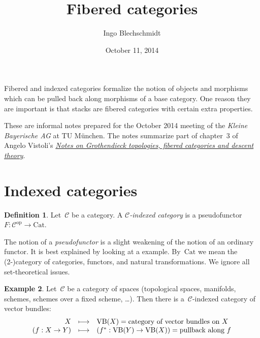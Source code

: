 \documentclass[a4paper,english,12pt]{scrartcl}
\theoremstyle{definition}
\newtheorem{defn}{Definition}[section]
\newtheorem{ex}[defn]{Example}
\theoremstyle{plain}
\theoremstyle{remark}
\newcommand{\C}{\mathcal{C}}
\newcommand{\op}{\mathrm{op}}
\renewcommand{\_}{\mathpunct{.}\,}
\newcommand{\?}{\,{:}\,}
\newcommand{\Cat}{\mathrm{Cat}}
\newcommand{\VB}{\mathrm{VB}}
\begin{document}
\title{Fibered categories}
\author{Ingo Blechschmidt}
\date{October 11, 2014}
\maketitle

\begin{center}\begin{minipage}{0.8\textwidth}
Fibered and indexed categories formalize the notion of objects and morphisms
which can be pulled back along morphisms of a base category. One reason they
are important is that stacks are fibered categories with certain extra
properties.\medskip

These are informal notes prepared for the October 2014 meeting of the \emph{Kleine
Bayerische AG} at TU München. The notes summarize part of chapter~3 of
Angelo Vistoli's \href{http://homepage.sns.it/vistoli/descent.pdf}{\emph{Notes
on Grothendieck topologies, fibered categories and descent theory}}.
\end{minipage}\end{center}
\vspace{1em}

\tableofcontents

\section{Indexed categories}

\begin{defn}Let~$\C$ be a category. A \emph{$\C$-indexed category} is a
pseudofunctor~$F : \C^\op \to \Cat$.\end{defn}

The notion of a \emph{pseudofunctor} is a slight weakening of the notion of an
ordinary functor. It is best explained by looking at a example. By~$\Cat$ we
mean the (2-)category of categories, functors, and natural transformations. We
ignore all set-theoretical issues.

\begin{ex}\label{ex:vb}Let~$\C$ be a category of spaces (topological spaces,
manifolds, schemes, schemes over a fixed scheme, \ldots). Then there is
a~$\C$-indexed category of vector bundles:
\[ \begin{array}{@{}rcl@{}}
  X &\longmapsto& \VB(X) = \text{category of vector bundles on~$X$} \\
  (f : X \to Y) &\longmapsto&
    (f^* : \VB(Y) \to \VB(X)) = \text{pullback along~$f$}
\end{array} \]
\end{ex}
\end{document}

